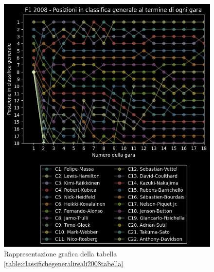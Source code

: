 \documentclass[12pt,a4paper,openright,twoside]{book}
\begin{document}
\begin{figure}[H]
    \centering
     \includegraphics[scale=1.0]{figures/realstandings2008.png}
     \caption{Rappresentazione grafica della tabella \ref{table:classifichegeneralireali2008tabella} }
     \label{fig:classifichegeneralireali2008figura}
 \end{figure}
\end{document}
